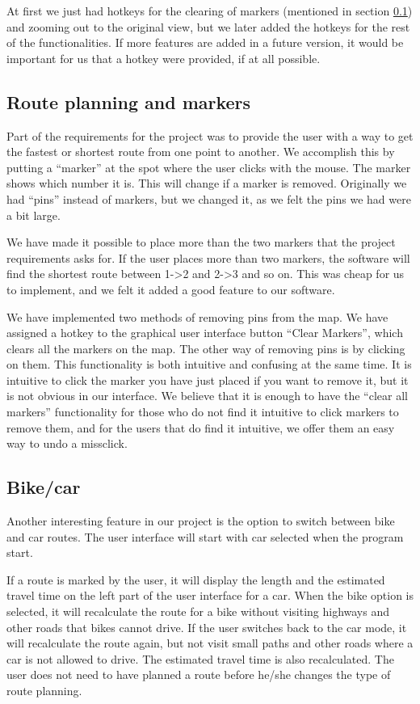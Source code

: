 At first we just had hotkeys for the clearing of markers (mentioned in section
\ref{UIA-IF-M}) and zooming out to the original view, but we later added the
hotkeys for the rest of the functionalities. If more features are added in a
future version, it would be important for us that a hotkey were provided, if at
all possible.
\subsection{Route planning and markers}
\label{UIA-IF-M}
Part of the requirements for the project was to provide the user with a way to
get the fastest or shortest route from one point to another. We accomplish this
by putting a ``marker'' at the spot where the user clicks with the mouse. The
marker shows which number it is. This will change if a marker is removed.
Originally we had ``pins'' instead of markers, but we changed it, as we felt the
pins we had were a bit large.

We have made it possible to place more than the two markers that the project
requirements asks for. If the user places more than two markers, the software
will find the shortest route between 1->2 and 2->3 and so on. This was cheap for
us to implement, and we felt it added a good feature to our software. 

We have implemented two methods of removing pins from the map. We have assigned
a hotkey to the graphical user interface button ``Clear Markers'', which clears
all the markers on the map. The other way of removing pins is by clicking on
them. This functionality is both intuitive and confusing at the same time. It is
intuitive to click the marker you have just placed if you want to remove it, but
it is not obvious in our interface. We believe that it is enough to have the
``clear all markers'' functionality for those who do not find it intuitive to
click markers to remove them, and for the users that do find it intuitive, we
offer them an easy way to undo a missclick.
\subsection{Bike/car}
\label{UIA-IF-BC}
Another interesting feature in our  project is the option
to switch between bike and car routes. The user interface will start with car
selected when the program start. 

If a route is marked by the user, it will display the length and the estimated
travel time on the left part of the user interface for a car. When the bike
option is selected, it will recalculate the route for a bike without visiting
highways and other roads that bikes cannot drive. If the user switches back to
the car mode, it will recalculate the route again, but not visit small paths and
other roads where a car is not allowed to drive. The estimated travel time is
also recalculated. The user does not need to have planned a route before he/she
changes the type of route planning.

